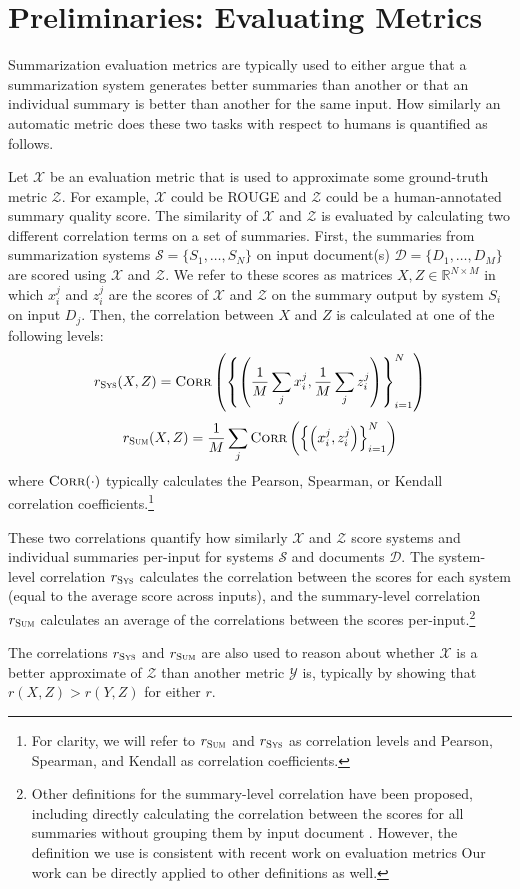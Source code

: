 \section{Preliminaries: Evaluating Metrics}
\label{sec:prelim}
Summarization evaluation metrics are typically used to either argue that a summarization system generates better summaries than another or that an individual summary is better than another for the same input.
How similarly an automatic metric does these two tasks with respect to humans is quantified as follows.

Let $\mathcal{X}$ be an evaluation metric that is used to approximate some ground-truth metric $\mathcal{Z}$.
For example, $\mathcal{X}$ could be ROUGE and $\mathcal{Z}$ could be a human-annotated summary quality score.
The similarity of $\mathcal{X}$ and $\mathcal{Z}$ is evaluated by calculating two different correlation terms on a set of summaries.
First, the summaries from summarization systems $\mathcal{S} = \{S_1, \dots, S_N\}$ on input document(s) $\mathcal{D} = \{D_1, \dots, D_M\}$ are scored using $\mathcal{X}$ and $\mathcal{Z}$.
We refer to these scores as matrices $X, Z \in \mathbb{R}^{N \times M}$ in which $x_i^j$ and $z_i^j$ are the scores of $\mathcal{X}$ and $\mathcal{Z}$ on the summary output by system $S_i$ on input $D_j$.
Then, the correlation between $X$ and $Z$ is calculated at one of the following levels:
\begin{gather*}
    r_\textsc{Sys}(X, Z) = \textsc{Corr}\left(\left\{\left(\frac{1}{M}\sum_j x^j_i, \frac{1}{M}\sum_j z^j_i\right)\right\}_{i=1}^N\right)
\end{gather*}
\begin{equation*}
    r_\textsc{Sum}(X, Z) = \frac{1}{M} \sum_j \textsc{Corr}\left(\left\{\left(x^j_i, z^j_i\right)\right\}_{i=1}^N\right)
\end{equation*}
where $\textsc{Corr}(\cdot)$ typically calculates the Pearson, Spearman, or Kendall correlation coefficients.\footnote{
For clarity, we will refer to $r_\textsc{Sum}$ and $r_\textsc{Sys}$ as correlation levels and Pearson, Spearman, and Kendall as correlation coefficients.
}

These two correlations quantify how similarly $\mathcal{X}$ and $\mathcal{Z}$ score systems and individual summaries per-input for systems $\mathcal{S}$ and documents $\mathcal{D}$.
The system-level correlation $r_\textsc{Sys}$ calculates the correlation between the scores for each system (equal to the average score across inputs), and the summary-level correlation $r_\textsc{Sum}$ calculates an average of the correlations between the scores per-input.\footnote{
    Other definitions for the summary-level correlation have been proposed, including directly calculating the correlation between the scores for all summaries without grouping them by input document \citep{OwczarzakDa11}.
    However, the definition we use is consistent with recent work on evaluation metrics \citep{PeyrardBoGu17,ZPLGME19,BGALN20,DeutschBeRo20}
    Our work can be directly applied to other definitions as well.
}

The correlations $r_\textsc{Sys}$ and $r_\textsc{Sum}$ are also used to reason about whether $\mathcal{X}$ is a better approximate of $\mathcal{Z}$ than another metric $\mathcal{Y}$ is, typically by showing that $r(X, Z) > r(Y, Z)$ for either $r$.
